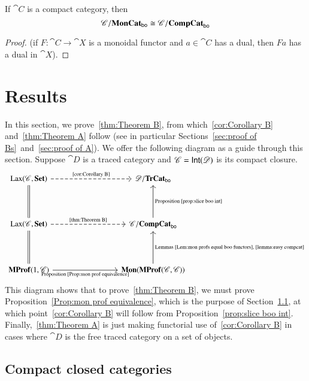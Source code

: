 \documentclass[12pt,oneside,article,draft]{memoir}
\begin{document}
\begin{lemma}\label{lemma:easy compcat}
	If $\cat{C}$ is a compact category, then
	\[
		\mathscr{C}/\mathbf{MonCat}_{\mathsf{bo}}\cong\mathscr{C}/\mathbf{CompCat}_{\mathsf{bo}}
	\]
\end{lemma}
\begin{proof}
	(if $F\colon\cat{C}\to\cat{X}$ is a monoidal functor and $a\in\cat{C}$ has a dual, then $Fa$ has a dual in $\cat{X}$).
\end{proof}


\chapter{Results}\label{sec:generalization}

In this section, we prove~\ref{thm:Theorem B}, from which~\ref{cor:Corollary B} and~\ref{thm:Theorem A} follow (see in particular Sections~\ref{sec:proof of Bs}~and~\ref{sec:proof of A}).
We offer the following diagram as a guide through this section.
Suppose $\cat{D}$ is a traced category and $\mathscr{C}=\mathsf{Int}(\mathscr{D})$ is its compact closure. 
\[
\begin{tikzcd}[column sep=3cm,row sep=1.5cm]
	\Lax(\cat{C},\Set)\ar[r,dashed,"\tn{\ref{cor:Corollary B}}"]\ar[d,equal] & \cat{D}/\TrCat_{\bo} \\
	\Lax(\cat{C},\Set)\ar[r,dashed,"\tn{\ref{thm:Theorem B}}"]\ar[d,equal] & \cat{C}/\CompCat_{\bo}\ar[u,"\tn{Proposition~\ref{prop:slice boo int}}"'] \\
	\MProf(1,\cat{C})\ar[r,"\tn{Proposition~\ref{Prop:mon prof equivalence}}"'] & \Mon(\MProf(\cat{C},\cat{C}))\ar[u,"\tn{Lemmas~\ref{Lem:mon profs equal boo functors},\ \ref{lemma:easy compcat}}"']
\end{tikzcd}
\]
This diagram shows that to prove~\ref{thm:Theorem B}, we must prove Proposition~\ref{Prop:mon prof equivalence}, which is the purpose of Section~\ref{sec:ccc's}, at which point~\ref{cor:Corollary B} will follow from Proposition~\ref{prop:slice boo int}.
Finally,~\ref{thm:Theorem A} is just making functorial use of~\ref{cor:Corollary B} in cases where $\cat{D}$ is the free traced category on a set of objects.

\section{Compact closed categories}\label{sec:ccc's}

\end{document}
